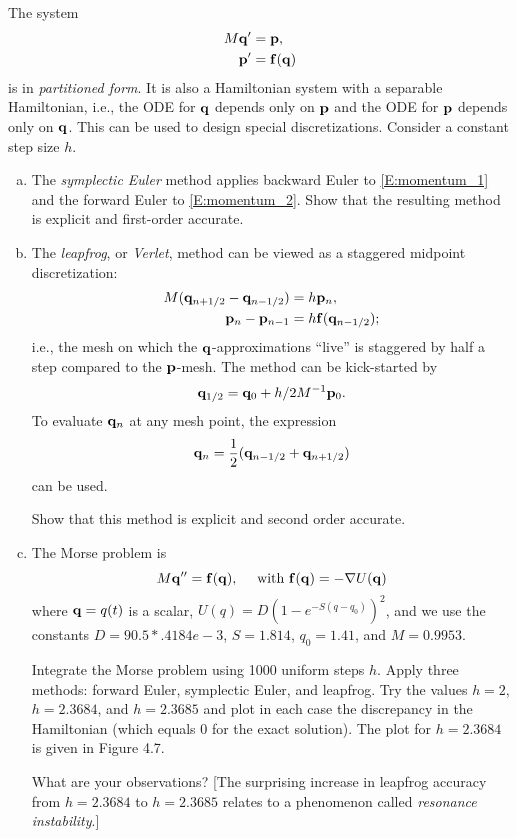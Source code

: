 \begin{problem}[A\&P 4.11]
  The system
  \begin{subequations}
    \begin{align}
      \label{E:momentum_1}
      M \mathbf{q}' &= \mathbf{p}, \\
      \label{E:momentum_2}
      \mathbf{p}' &= \mathbf{f}(\mathbf{q})
    \end{align}
  \end{subequations}
  is in \emph{partitioned form}. It is also a Hamiltonian system with a separable Hamiltonian, i.e., the ODE for $\mathbf{q}$ depends only on $\mathbf{p}$ and the ODE for $\mathbf{p}$ depends only on $\mathbf{q}$. This can be used to design special discretizations. Consider a constant step size $h$.
  \begin{enumerate}[(a)]
    \item The \emph{symplectic Euler} method applies backward Euler to \eqref{E:momentum_1} and the forward Euler to \eqref{E:momentum_2}. Show that the resulting method is explicit and first-order accurate.
    \item The \emph{leapfrog}, or \emph{Verlet}, method can be viewed as a staggered midpoint discretization:
    \begin{align*}
      M(\mathbf{q}_{n+1/2} - \mathbf{q}_{n-1/2}) &= h \mathbf{p}_n, \\
      \mathbf{p}_n - \mathbf{p}_{n-1} &= h \mathbf{f}(\mathbf{q}_{n-1/2});
    \end{align*}
    i.e., the mesh on which the $\mathbf{q}$-approximations ``live'' is staggered by half a step compared to the $\mathbf{p}$-mesh. The method can be kick-started by
    \[
      \mathbf{q}_{1/2} = \mathbf{q}_0 + h/2 M^{-1}\mathbf{p}_0.
    \]
    To evaluate $\mathbf{q}_n$ at any mesh point, the expression
    \[
      \mathbf{q}_n = \frac12 (\mathbf{q}_{n-1/2} + \mathbf{q}_{n+1/2})
    \]
    can be used.
    
    Show that this method is explicit and second order accurate.
    \item The Morse problem is 
    \[
      M \mathbf{q}'' = \mathbf{f}(\mathbf{q}), \quad \text{ with } \mathbf{f}(\mathbf{q}) = -\mathbf{\nabla} U(\mathbf{q})
    \]
    where $\mathbf{q} = q(t)$ is a scalar, $U(q) = D(1 - e^{-S(q-q_0)})^2$, and we use the constants $D = 90.5*.4184e-3$, $S = 1.814$, $q_0 = 1.41$, and $M = 0.9953$.
    
    Integrate the Morse problem using 1000 uniform steps $h$. Apply three methods: forward Euler, symplectic Euler, and leapfrog. Try the values $h = 2$, $h = 2.3684$, and $h = 2.3685$ and plot in each case the discrepancy in the Hamiltonian (which equals 0 for the exact solution). The plot for $h = 2.3684$ is given in Figure 4.7.
    
    What are your observations? [The surprising increase in leapfrog accuracy from $h = 2.3684$ to $h = 2.3685$ relates to a phenomenon called \emph{resonance instability}.]
  \end{enumerate}
\end{problem}

